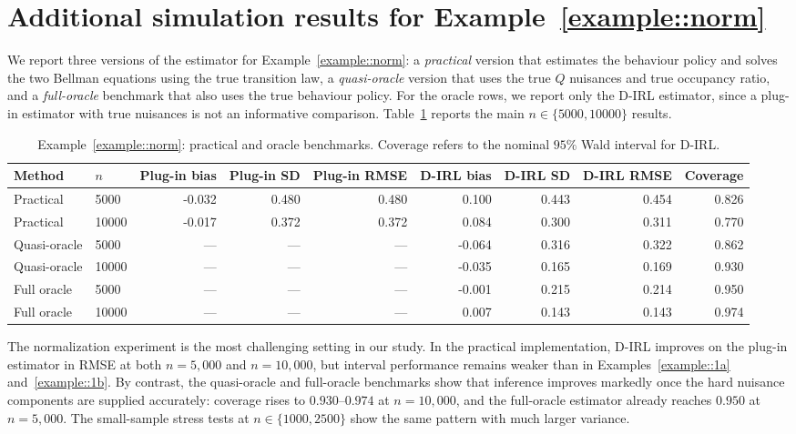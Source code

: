 \documentclass[11pt]{article}
\theoremstyle{plain}
\begin{document}
\section{Additional simulation results for Example~\ref{example::norm}}
\label{app::normsim}

We report three versions of the estimator for Example~\ref{example::norm}: a
\emph{practical} version that estimates the behaviour policy and solves the two
Bellman equations using the true transition law, a \emph{quasi-oracle} version
that uses the true \(Q\) nuisances and true occupancy ratio, and a
\emph{full-oracle} benchmark that also uses the true behaviour policy. For the
oracle rows, we report only the D-IRL estimator, since a plug-in estimator
with true nuisances is not an informative comparison.
Table~\ref{tab:simulation-ex2} reports the main \(n \in \{5000,10000\}\)
results.

\begin{table}[htb]
\centering
\caption{Example~\ref{example::norm}: practical and oracle benchmarks.
Coverage refers to the nominal $95\%$ Wald interval for D-IRL.}
\label{tab:simulation-ex2}
\begingroup
\small
\setlength{\tabcolsep}{4pt}
\begin{tabular}{llrrrrrrr}
\toprule
Method & $n$ & Plug-in bias & Plug-in SD & Plug-in RMSE & D-IRL bias & D-IRL SD & D-IRL RMSE & Coverage \\
\midrule
Practical & 5000 & -0.032 & 0.480 & 0.480 & 0.100 & 0.443 & 0.454 & 0.826 \\
Practical & 10000 & -0.017 & 0.372 & 0.372 & 0.084 & 0.300 & 0.311 & 0.770 \\
Quasi-oracle & 5000 & --- & --- & --- & -0.064 & 0.316 & 0.322 & 0.862 \\
Quasi-oracle & 10000 & --- & --- & --- & -0.035 & 0.165 & 0.169 & 0.930 \\
Full oracle & 5000 & --- & --- & --- & -0.001 & 0.215 & 0.214 & 0.950 \\
Full oracle & 10000 & --- & --- & --- & 0.007 & 0.143 & 0.143 & 0.974 \\
\bottomrule
\end{tabular}
\endgroup
\end{table}

The normalization experiment is the most challenging setting in our study. In
the practical implementation, D-IRL improves on the plug-in estimator in RMSE
at both \(n=5{,}000\) and \(n=10{,}000\), but interval performance remains
weaker than in Examples~\ref{example::1a} and~\ref{example::1b}. By contrast,
the quasi-oracle and full-oracle benchmarks show that inference improves
markedly once the hard nuisance components are supplied accurately: coverage
rises to \(0.930\)--\(0.974\) at \(n=10{,}000\), and the full-oracle estimator
already reaches \(0.950\) at \(n=5{,}000\). The small-sample stress tests at
\(n \in \{1000,2500\}\) show the same pattern with much larger variance.
\end{document}
